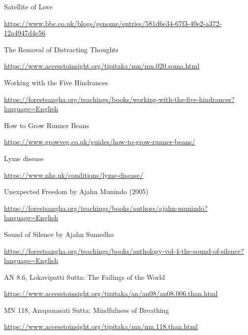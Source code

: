 \begin{thebibliography}{9}
 Satellite of Love

  {\urlsize \url{https://www.bbc.co.uk/blogs/genome/entries/581d6e34-67f3-40e2-a372-12a4947d4c56}}

 The Removal of Distracting Thoughts

  {\urlsize \url{https://www.accesstoinsight.org/tipitaka/mn/mn.020.soma.html}}

 Working with the Five Hindrances

  {\urlsize \url{https://forestsangha.org/teachings/books/working-with-the-five-hindrances?language=English}}

 How to Grow Runner Beans

  {\urlsize \url{https://www.growveg.co.uk/guides/how-to-grow-runner-beans/}}

 Lyme disease

  {\urlsize \url{https://www.nhs.uk/conditions/lyme-disease/}}

 Unexpected Freedom by Ajahn Munindo (2005)

  {\urlsize \url{https://forestsangha.org/teachings/books/authors/ajahn-munindo?language=English}}

 Sound of Silence by Ajahn Sumedho

  {\urlsize \url{https://forestsangha.org/teachings/books/anthology-vol-4-the-sound-of-silence?language=English}}

 AN 8.6, Lokavipatti Sutta: The Failings of the World

  {\urlsize \url{https://www.accesstoinsight.org/tipitaka/an/an08/an08.006.than.html}}

 MN 118, Anapanasati Sutta: Mindfulness of Breathing

  {\urlsize \url{https://www.accesstoinsight.org/tipitaka/mn/mn.118.than.html}}

\end{thebibliography}
